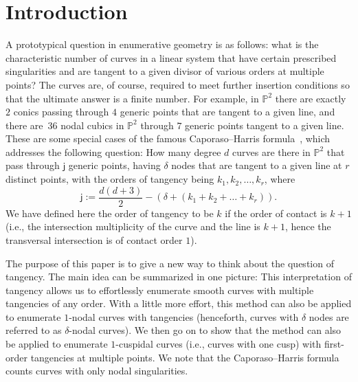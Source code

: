 \documentclass[pdftex]{sigma}
\numberwithin{equation}{section}
\begin{document}


\section{Introduction}
A prototypical question in enumerative geometry is as follows: what is the characteristic number of
curves in a linear system that have certain
prescribed singularities and are tangent to a given divisor of various orders at multiple points?
The curves are, of course, required to meet further insertion conditions so that the ultimate answer is a finite
number. For example,
in $\mathbb{P}^2$ there are exactly $2$ conics passing through $4$ generic points that are tangent to a given line, and there
are~36 nodal cubics in $\mathbb{P}^2$ through $7$ generic points tangent to a given line.
These are some special cases of the famous Caporaso--Harris formula~\cite{CH}, which addresses the following question:
How many degree $d$ curves are there in $\mathbb{P}^2$ that pass through
$\mathsf{j}$ generic points, having $\delta$ nodes that are
tangent to a given line at $r$ distinct points,
with the orders of tangency being $k_1, k_2,\dots, k_r$, where
\[ \mathsf{j} := \frac{d(d+3)}{2} -(\delta +(k_1+k_2+ \dots + k_r)). \]
We have defined here the order of tangency to be $k$ if the order of contact is $k+1$ (i.e., the intersection multiplicity of the curve and the line is $k+1$, hence the transversal intersection is of contact order $1$).

The purpose of this paper is to give a new way to think about the question of tangency.
The main idea can be summarized in one picture:
This interpretation of tangency allows us to
effortlessly enumerate smooth curves with multiple tangencies of any order.
With a little more effort, this method can also be applied to enumerate
$1$-nodal curves with tangencies (henceforth, curves with $\delta$ nodes are referred
to as $\delta$-nodal curves). We then go on to show that the method
can also be applied to enumerate $1$-cuspidal curves (i.e., curves with one cusp)
with first-order tangencies at multiple points.
We note that the Caporaso--Harris formula counts curves with only nodal singularities.
\end{document}
